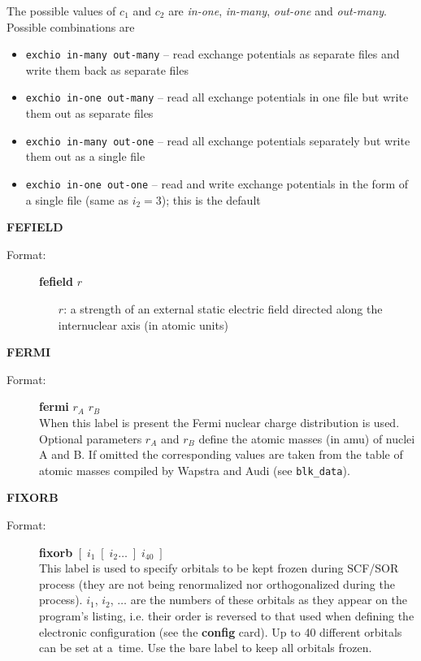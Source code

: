 \documentclass[12pt,a4paper]{article}
\newcommand{\ft}[1]{\texttt{#1}}
\newcommand{\fb}[1]{\textbf{#1}}
\begin{document}
\begin{description}
\begin{description}
The possible values of $c_1$ and $c_2$ are \textsl{in-one},
\textsl{in-many}, \textsl{out-one} and \textsl{out-many}. Possible
combinations are
\begin{itemize} 
\item \verb+exchio in-many out-many+ -- read exchange potentials as separate files and
  write them back as separate files

\item \verb+exchio in-one out-many+ -- read all exchange potentials in one file but write
  them out as separate files

\item \verb+exchio in-many out-one+ -- read all exchange potentials separately but write
  them out as a single file

\item \verb+exchio in-one out-one+ -- read and write exchange potentials in the form of a
  single file (same as $i_2=3$); this is the default
\end{itemize} 

\end{description} 


\item \textbf{FEFIELD} 
\begin{description} 
\item[Format:] \textbf{fefield} $r$  
\begin{itemize}
\item[$r$:] a strength of an external static electric field directed along
  the internuclear axis (in atomic units)
\end{itemize} 
\end{description} 



\item \textbf{FERMI} 
\begin{description} 
\item[Format:] \textbf{fermi} $r_A$ $r_B$ \\ When this label is present the Fermi nuclear
  charge distribution is used. Optional parameters $r_A$ and $r_B$ define the atomic
  masses (in amu) of nuclei A and B. If omitted the corresponding values are taken from
  the table of atomic masses compiled by Wapstra and Audi (see \ft{blk\_data}).
\end{description} 


\item \textbf{FIXORB}
\begin{description} 
\item[Format:] \textbf{fixorb} $[\; i_1 \; [\;i_2 \ldots \;] \;i_{40}\;]$ \\ This label is
  used to specify orbitals to be kept frozen during SCF/SOR process (they are not being
  renormalized nor orthogonalized during the process). $i_1$, $i_2$, $\ldots$ are the
  numbers of these orbitals as they appear on the program's listing, i.e. their order is
  reversed to that used when defining the electronic configuration (see the \fb{config}
  card). Up to 40 different orbitals can be set at a~time. Use the bare label to keep all
  orbitals frozen.


\end{description}
\end{description}
\end{document}

